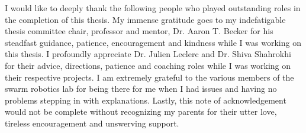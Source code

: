 

I would like to deeply thank the following people who played outstanding roles in the completion of this thesis. My immense gratitude goes to my indefatigable thesis committee chair, professor and mentor, Dr. Aaron T. Becker for his steadfast guidance, patience, encouragement and kindness while I was working on this thesis. I profoundly appreciate Dr. Julien Leclerc and Dr. Shiva Shahrokhi for their advice, directions, patience and coaching roles while I was working on their respective projects. I am extremely grateful to the various members of the swarm robotics lab for being there for me when I had issues and having no problems stepping in with explanations. Lastly, this note of acknowledgement would not be complete without recognizing my parents for their utter love, tireless encouragement and unswerving support. 